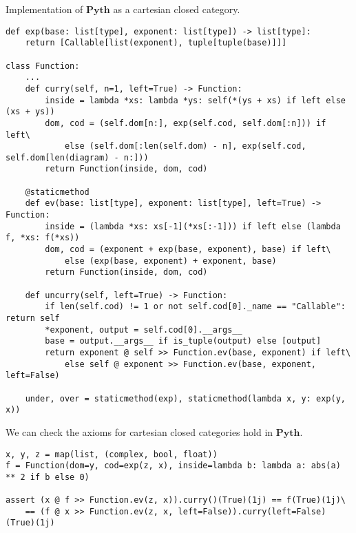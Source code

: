 \begin{python}\label{example:closed-function}
{\normalfont Implementation of $\mathbf{Pyth}$ as a cartesian closed category.}

\begin{verbatim}
def exp(base: list[type], exponent: list[type]) -> list[type]:
    return [Callable[list(exponent), tuple[tuple(base)]]]

class Function:
    ...
    def curry(self, n=1, left=True) -> Function:
        inside = lambda *xs: lambda *ys: self(*(ys + xs) if left else (xs + ys))
        dom, cod = (self.dom[n:], exp(self.cod, self.dom[:n])) if left\
            else (self.dom[:len(self.dom) - n], exp(self.cod, self.dom[len(diagram) - n:]))
        return Function(inside, dom, cod)

    @staticmethod
    def ev(base: list[type], exponent: list[type], left=True) -> Function:
        inside = (lambda *xs: xs[-1](*xs[:-1])) if left else (lambda f, *xs: f(*xs))
        dom, cod = (exponent + exp(base, exponent), base) if left\
            else (exp(base, exponent) + exponent, base)
        return Function(inside, dom, cod)

    def uncurry(self, left=True) -> Function:
        if len(self.cod) != 1 or not self.cod[0]._name == "Callable": return self
        *exponent, output = self.cod[0].__args__
        base = output.__args__ if is_tuple(output) else [output]
        return exponent @ self >> Function.ev(base, exponent) if left\
            else self @ exponent >> Function.ev(base, exponent, left=False)

    under, over = staticmethod(exp), staticmethod(lambda x, y: exp(y, x))
\end{verbatim}
\end{python}

\begin{example}
We can check the axioms for cartesian closed categories hold in $\mathbf{Pyth}$.

\begin{verbatim}
x, y, z = map(list, (complex, bool, float))
f = Function(dom=y, cod=exp(z, x), inside=lambda b: lambda a: abs(a) ** 2 if b else 0)

assert (x @ f >> Function.ev(z, x)).curry()(True)(1j) == f(True)(1j)\
    == (f @ x >> Function.ev(z, x, left=False)).curry(left=False)(True)(1j)
\end{verbatim}
\end{example}

